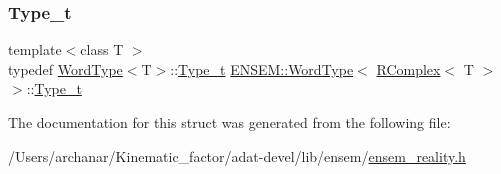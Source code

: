\subsubsection{\texorpdfstring{Type\_t}{Type\_t}\hspace{0.1cm}{\footnotesize\ttfamily [3/3]}}
{\footnotesize\ttfamily template$<$class T $>$ \\
typedef \mbox{\hyperlink{structENSEM_1_1WordType}{Word\+Type}}$<$T$>$\+::\mbox{\hyperlink{structENSEM_1_1WordType_3_01RComplex_3_01T_01_4_01_4_a24d907e746d8f478924d91103a7da3d5}{Type\+\_\+t}} \mbox{\hyperlink{structENSEM_1_1WordType}{E\+N\+S\+E\+M\+::\+Word\+Type}}$<$ \mbox{\hyperlink{classENSEM_1_1RComplex}{R\+Complex}}$<$ T $>$ $>$\+::\mbox{\hyperlink{structENSEM_1_1WordType_3_01RComplex_3_01T_01_4_01_4_a24d907e746d8f478924d91103a7da3d5}{Type\+\_\+t}}}



The documentation for this struct was generated from the following file\+:\begin{DoxyCompactItemize}
\item 
/\+Users/archanar/\+Kinematic\+\_\+factor/adat-\/devel/lib/ensem/\mbox{\hyperlink{adat-devel_2lib_2ensem_2ensem__reality_8h}{ensem\+\_\+reality.\+h}}\end{DoxyCompactItemize}
